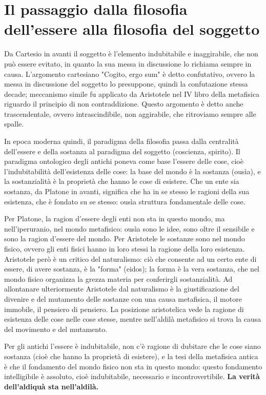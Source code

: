 \chapter{Il passaggio dalla filosofia dell'essere alla filosofia del soggetto}

\bigskip
\bigskip
\bigskip
\bigskip
\bigskip


Da Cartesio in avanti il soggetto è l'elemento indubitabile e inaggirabile, che non può essere evitato, in quanto la sua messa in discussione lo richiama sempre in causa. L'argomento cartesiano "Cogito, ergo sum" è detto confutativo, ovvero la messa in discussione del soggetto lo presuppone, quindi la confutazione stessa decade; meccanismo simile fu applicato da Aristotele nel IV libro della metafisica riguardo il principio di non contraddizione. Questo argomento è detto anche trascendentale, ovvero intrascindibile, non aggirabile, che ritroviamo sempre alle spalle.

In epoca moderna quindi, il paradigma della filosofia passa dalla centralità dell'essere e della sostanza al paradigma del soggetto (coscienza, spirito). Il paradigma ontologico degli antichi poneva come base l'essere delle cose, cioè l'indubitabilità dell'esistenza delle cose: la base del mondo è la sostanza (ousìa), e la sostanzialità è la proprietà che hanno le cose di esistere. Che un ente sia sostanza, da Platone in avanti, significa che ha in se stesso le ragioni della sua esistenza, che è fondato su se stesso: ousìa struttura fondamentale delle cose.

Per Platone, la ragion d'essere degli enti non sta in questo mondo, ma nell'iperuranio, nel mondo metafisico: ousìa sono le idee, sono oltre il sensibile e sono la ragion d'essere del mondo. Per Aristotele le sostanze sono nel mondo fisico, ovvero gli enti fisici hanno in loro stessi la ragione della loro esistenza. Aristotele però è un critico del naturalismo: ciò che consente ad un certo ente di essere, di avere sostanza, è la "forma" (eidos); la forma è la vera sostanza, che nel mondo fisico organizza la grezza materia per conferirgli sostanzialità. Ad allontanare ulteriormente Aristotele dal naturalismo è la giustificazione del divenire e del mutamento delle sostanze con una causa metafisica, il motore immobile, il pensiero di pensiero. La posizione aristotelica vede la ragione di esistenza delle cose nelle cose stesse, mentre nell'aldilà metafisico si trova la causa del movimento e del mutamento.

Per gli antichi l'essere è indubitabile, non c'è ragione di dubitare che le cose siano sostanza (cioè che hanno la proprietà di esistere), e la tesi della metafisica antica è che il fondamento del mondo fisico non sta in questo mondo: questo fondamento intelligibile è assoluto, cioè indubitabile, necessario e incontrovertibile. \textbf{La verità dell'aldiquà sta nell'aldilà.}

